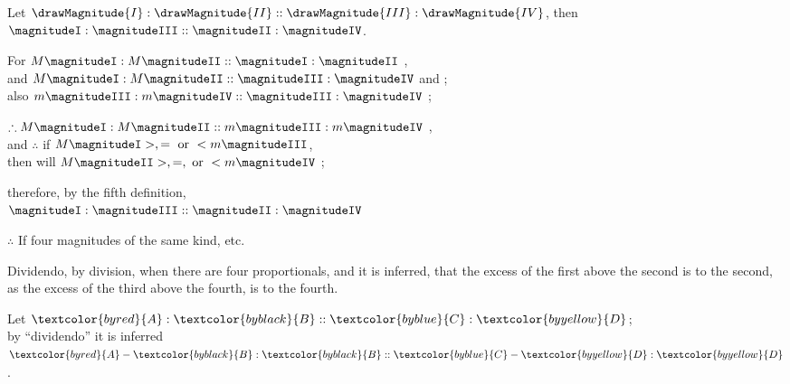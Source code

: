 \documentclass[booklanguage=english]{byrnebook}
\begin{document}
\vfill\pagebreak

\label{prop:V.XVI}

\begin{center}
Let $\drawMagnitude{I} : \drawMagnitude{II} :: \drawMagnitude{III} : \drawMagnitude{IV}$, then $\magnitudeI : \magnitudeIII :: \magnitudeII : \magnitudeIV$.

For $M \magnitudeI : M \magnitudeII :: \magnitudeI : \magnitudeII$ ,\\
and $M \magnitudeI : M \magnitudeII :: \magnitudeIII : \magnitudeIV$ \byref{\hypref} and ;\\
also $m \magnitudeIII : m \magnitudeIV :: \magnitudeIII : \magnitudeIV$ ;

$\therefore M \magnitudeI : M \magnitudeII :: m \magnitudeIII : m \magnitudeIV$ ,\\
and $\therefore$ if $M \magnitudeI >, = \mbox { or } < m \magnitudeIII$,\\
then will $M \magnitudeII >, =, \mbox{ or } < m \magnitudeIV$ ;

therefore, by the fifth definition,\\
 $\magnitudeI : \magnitudeIII :: \magnitudeII : \magnitudeIV$

 $\therefore$ If four magnitudes of the same kind, etc.
\end{center}

\label{def:V.XVI} 
\def\varA{\textcolor{byred}{A}}
\def\varB{\textcolor{byblack}{B}}
\def\varC{\textcolor{byblue}{C}}
\def\varD{\textcolor{byyellow}{D}}
Dividendo, by division, when there are four proportionals, and it is inferred, that the excess of the first above the second is to the second, as the excess of the third above the fourth, is to the fourth.

\begin{center}
Let $\varA : \varB :: \varC : \varD$;\\
by \enquote{dividendo} it is inferred\\
$\varA - \varB : \varB :: \varC - \varD : \varD$. %
\end{center}
\end{document}
